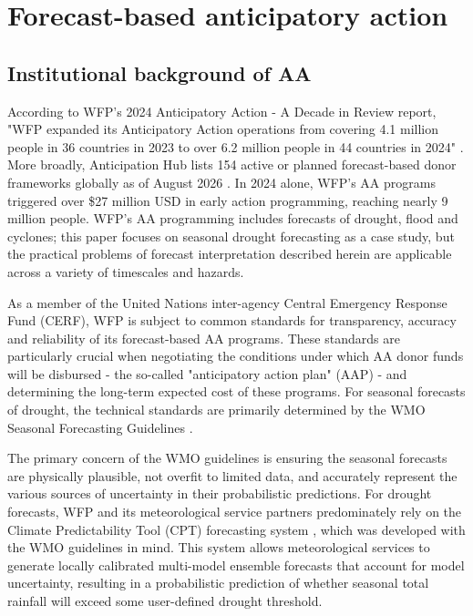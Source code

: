 \documentclass{ametsocV6.1}
\begin{document}
\section{Forecast-based anticipatory action}

\subsection{Institutional background of AA}

According to WFP's 2024 Anticipatory Action - A Decade in Review report, "WFP expanded its Anticipatory Action operations from covering 4.1 million people in 36 countries in 2023 to over 6.2 million people in 44 countries in 2024" \citep{world_food_programme_10_2024}. More broadly, Anticipation Hub lists 154 active or planned forecast-based donor frameworks globally as of August 2026 \citep{noauthor_global_nodate}. In 2024 alone, WFP's AA programs triggered over \$27 million USD in early action programming, reaching nearly 9 million people. WFP's AA programming includes forecasts of drought, flood and cyclones; this paper focuses on seasonal drought forecasting as a case study, but the practical problems of forecast interpretation described herein are applicable across a variety of timescales and hazards.

As a member of the United Nations inter-agency Central Emergency Response Fund (CERF), WFP is subject to common standards for transparency, accuracy and reliability of its forecast-based AA programs. These standards are particularly crucial when negotiating the conditions under which AA donor funds will be disbursed - the so-called "anticipatory action plan" (AAP) - and determining the long-term expected cost of these programs. For seasonal forecasts of drought, the technical standards are primarily determined by the WMO Seasonal Forecasting Guidelines \citep{world_meteorological_organization_guidance_2020}. 

The primary concern of the WMO guidelines is ensuring the seasonal forecasts are physically plausible, not overfit to limited data, and accurately represent the various sources of uncertainty in their probabilistic predictions. For drought forecasts, WFP and its meteorological service partners predominately rely on the Climate Predictability Tool (CPT) forecasting system \citep{acharya_next_2021}, which was developed with the WMO guidelines in mind. This system allows meteorological services to generate locally calibrated multi-model ensemble forecasts that account for model uncertainty, resulting in a probabilistic prediction of whether seasonal total rainfall will exceed some user-defined drought threshold.
\end{document}
